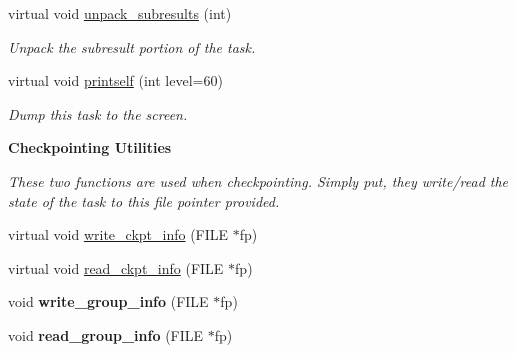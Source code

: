 \begin{Indent}
\begin{DoxyCompactItemize}
\mbox{\label{classMWTask_ae6fe9fd144486e79c19a1087da1fd7ab}} 
virtual void \hyperlink{classMWTask_ae6fe9fd144486e79c19a1087da1fd7ab}{unpack\+\_\+subresults} (int)
\begin{DoxyCompactList}\small\item\em Unpack the subresult portion of the task. \end{DoxyCompactList}\item 
\mbox{\label{classMWTask_a013363bc92d9ce9f0fc36fb4171b03d1}} 
virtual void \hyperlink{classMWTask_a013363bc92d9ce9f0fc36fb4171b03d1}{printself} (int level=60)
\begin{DoxyCompactList}\small\item\em Dump this task to the screen. \end{DoxyCompactList}\end{DoxyCompactItemize}
\end{Indent}
\begin{Indent}\textbf{ Checkpointing Utilities}\par
{\em These two functions are used when checkpointing. Simply put, they write/read the state of the task to this file pointer provided. }\begin{DoxyCompactItemize}
\item 
virtual void \hyperlink{classMWTask_af6ec7477171732f7e3a6de76a86b37a6}{write\+\_\+ckpt\+\_\+info} (F\+I\+LE $\ast$fp)
\item 
virtual void \hyperlink{classMWTask_ab370bc3712cfd33ff9a22462d62f3f0f}{read\+\_\+ckpt\+\_\+info} (F\+I\+LE $\ast$fp)
\item 
\mbox{\label{classMWTask_a8e5452b7365249557c65d27a15958e21}} 
void {\bfseries write\+\_\+group\+\_\+info} (F\+I\+LE $\ast$fp)
\item 
\mbox{\label{classMWTask_a2b4efaec8e0b452e6c526f70630c79d3}} 
void {\bfseries read\+\_\+group\+\_\+info} (F\+I\+LE $\ast$fp)
\end{DoxyCompactItemize}
\end{Indent}

